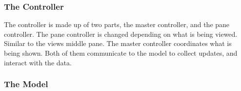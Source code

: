 \subsubsection{The Controller}
\label{subsubsec:the_controller}

The controller is made up of two parts, the master controller, and the pane controller. The pane controller is changed depending on what is being viewed. Similar to the views middle pane. The master controller coordinates what is being shown. Both of them communicate to the model to collect updates, and interact with the data.

\subsubsection{The Model}
\label{subsubsec:the_model}

